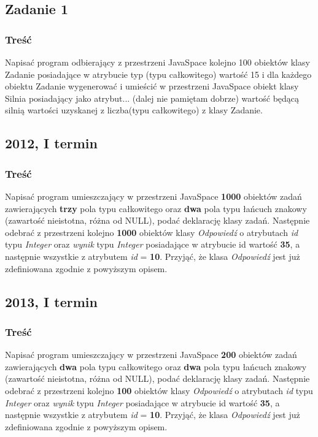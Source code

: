 	\subsection{Zadanie 1}
		\subsubsection{Treść}
			Napisać program odbierający z przestrzeni JavaSpace kolejno 100 obiektów klasy Zadanie posiadające w atrybucie typ (typu całkowitego) wartość 15 i dla każdego obiektu Zadanie wygenerować i umieścić w przestrzeni JavaSpace obiekt klasy Silnia posiadający jako atrybut... (dalej nie pamiętam dobrze) wartość będącą silnią wartości uzyskanej z liczba(typu całkowitego) z klasy Zadanie.
			
	\subsection{2012, I termin}
		\subsubsection{Treść}
			Napisać program umieszczający w przestrzeni JavaSpace \textbf{1000} obiektów zadań zawierających \textbf{trzy} pola typu całkowitego oraz \textbf{dwa} pola typu łańcuch znakowy (zawartość nieistotna, różna od NULL), podać deklarację klasy zadań. Następnie odebrać z przestrzeni kolejno \textbf{1000} obiektów klasy \textit{Odpowiedź} o atrybutach \textit{id} typu \textit{Integer} oraz \textit{wynik} typu \textit{Integer} posiadające w atrybucie id wartość \textbf{35}, a następnie wszystkie z atrybutem \textit{id} = \textbf{10}. Przyjąć, że klasa \textit{Odpowiedź} jest już zdefiniowana zgodnie z powyższym opisem.
			
	\subsection{2013, I termin}
		\subsubsection{Treść}
			Napisać program umieszczający w przestrzeni JavaSpace \textbf{200} obiektów zadań zawierających \textbf{dwa} pola typu całkowitego oraz \textbf{dwa} pola typu łańcuch znakowy (zawartość nieistotna, różna od NULL), podać deklarację klasy zadań. Następnie odebrać z przestrzeni kolejno \textbf{100} obiektów klasy \textit{Odpowiedź} o atrybutach \textit{id} typu \textit{Integer} oraz \textit{wynik} typu \textit{Integer} posiadające w atrybucie id wartość \textbf{35}, a następnie wszystkie z atrybutem \textit{id} = \textbf{10}. Przyjąć, że klasa \textit{Odpowiedź} jest już zdefiniowana zgodnie z powyższym opisem.
	
	
	
	
	
	
	
	
	
	
	
	
	
	
	
	
	
	
	
	
	
	
